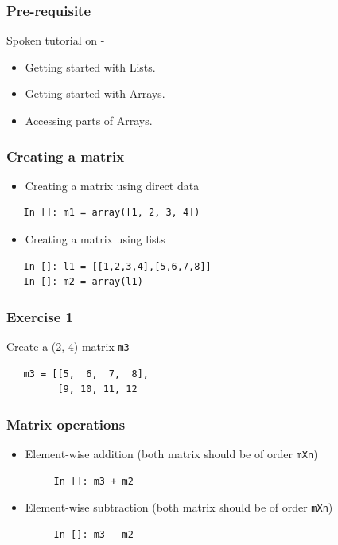 \documentclass[presentation]{beamer}
\begin{document}
\begin{frame}
\frametitle{Pre-requisite}
\label{sec-3}

  Spoken tutorial on -

\begin{itemize}
\item Getting started with Lists.
\item Getting started with Arrays.
\item Accessing parts of Arrays.
\end{itemize}
\end{frame}
\begin{frame}[fragile]
\frametitle{Creating a matrix}
\label{sec-4}


\begin{itemize}
\item Creating a matrix using direct data
\end{itemize}
\begin{verbatim}
   In []: m1 = array([1, 2, 3, 4])
\end{verbatim}


\begin{itemize}
\item Creating a matrix using lists
\end{itemize}
\begin{verbatim}
   In []: l1 = [[1,2,3,4],[5,6,7,8]]
   In []: m2 = array(l1)
\end{verbatim}
\end{frame}
\begin{frame}[fragile]
\frametitle{Exercise 1}
\label{sec-5}

  Create a (2, 4) matrix \verb~m3~
\begin{verbatim}
   m3 = [[5,  6,  7,  8],
         [9, 10, 11, 12
\end{verbatim}
\end{frame}
\begin{frame}[fragile]
\frametitle{Matrix operations}
\label{sec-6}


\begin{itemize}
\item Element-wise addition (both matrix should be of order \verb~mXn~)
\begin{verbatim}
     In []: m3 + m2
\end{verbatim}

\item Element-wise subtraction (both matrix should be of order \verb~mXn~)
\begin{verbatim}
     In []: m3 - m2
\end{verbatim}

\end{itemize}
\end{frame}
\end{document}
